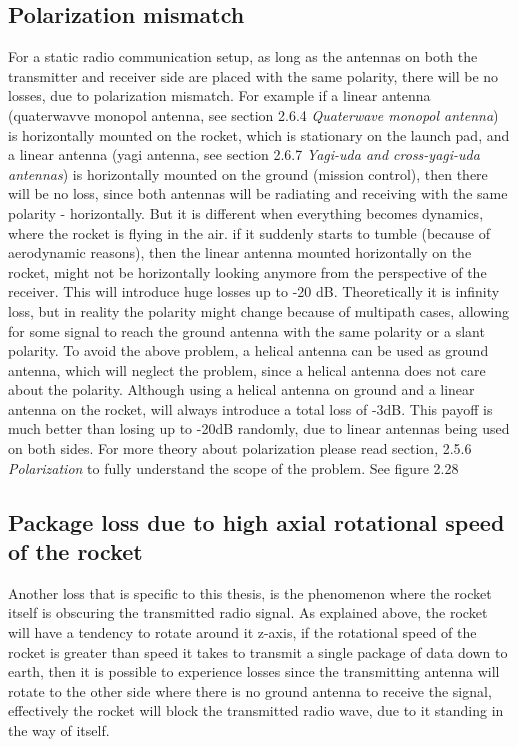 \subsection{Polarization mismatch}
For a static radio communication setup, as long as the antennas on both the transmitter and receiver side are placed with the same polarity, there will be no losses, due to polarization mismatch. For example if a linear antenna (quaterwavve monopol antenna, see section 2.6.4 \textit{Quaterwave monopol antenna}) is horizontally mounted on the rocket, which is stationary on the launch pad, and a linear antenna (yagi antenna, see section 2.6.7 \textit{Yagi-uda and cross-yagi-uda antennas}) is horizontally mounted on the ground (mission control), then there will be no loss, since both antennas will be radiating and receiving with the same polarity - horizontally. But it is different when everything becomes dynamics, where the rocket is flying in the air. if it suddenly starts to tumble (because of aerodynamic reasons), then the linear antenna mounted horizontally on the rocket, might not be horizontally looking anymore from the perspective of the receiver. This will introduce huge losses up to -20 dB. Theoretically it is infinity loss, but in reality the polarity might change because of multipath cases, allowing for some signal to reach the ground antenna with the same polarity or a slant polarity. To avoid the above problem, a helical antenna can be used as ground antenna, which will neglect the problem, since a helical antenna does not care about the polarity. Although using a helical antenna on ground and a linear antenna on the rocket, will always introduce a total loss of -3dB. This payoff is much better than losing up to -20dB randomly, due to linear antennas being used on both sides. For more theory about polarization please read section, 2.5.6 \textit{Polarization} to fully understand the scope of the problem. See figure 2.28 

\subsection{Package loss due to high axial rotational speed of the rocket}
Another loss that is specific to this thesis, is the phenomenon where the rocket itself is obscuring the transmitted radio signal. As explained above, the rocket will have a tendency to rotate around it z-axis, if the rotational speed of the rocket is greater than speed it takes to transmit a single package of data down to earth, then it is possible to experience losses since the transmitting antenna will rotate to the other side where there is no ground antenna to receive the signal, effectively the rocket will block the transmitted radio wave, due to it standing in the way of itself. 

